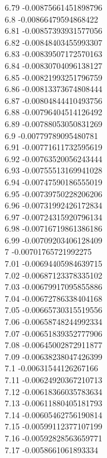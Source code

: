 {6.79	-0.00875661451898796\\
6.8	-0.00866479594868422\\
6.81	-0.00857393931577056\\
6.82	-0.00848403455993307\\
6.83	-0.00839507172570163\\
6.84	-0.00830704096138127\\
6.85	-0.00821993251796759\\
6.86	-0.00813373674808444\\
6.87	-0.00804844410493756\\
6.88	-0.00796404514126492\\
6.89	-0.00788053050831269\\
6.9	-0.00779789095480781\\
6.91	-0.00771611732595619\\
6.92	-0.00763520056243444\\
6.93	-0.00755513169941028\\
6.94	-0.00747590186555019\\
6.95	-0.00739750228206206\\
6.96	-0.00731992426172834\\
6.97	-0.00724315920796134\\
6.98	-0.00716719861386186\\
6.99	-0.00709203406128409\\
7	-0.00701765721992275\\
7.01	-0.00694405984639715\\
7.02	-0.00687123378335102\\
7.03	-0.00679917095855886\\
7.04	-0.00672786338404168\\
7.05	-0.00665730315519556\\
7.06	-0.00658748244992334\\
7.07	-0.00651839352777906\\
7.08	-0.00645002872911877\\
7.09	-0.00638238047426399\\
7.1	-0.00631544126267166\\
7.11	-0.00624920367210713\\
7.12	-0.00618366035783634\\
7.13	-0.00611880405181793\\
7.14	-0.00605462756190814\\
7.15	-0.00599112377107199\\
7.16	-0.00592828563659771\\
7.17	-0.0058661061893334\\
}
